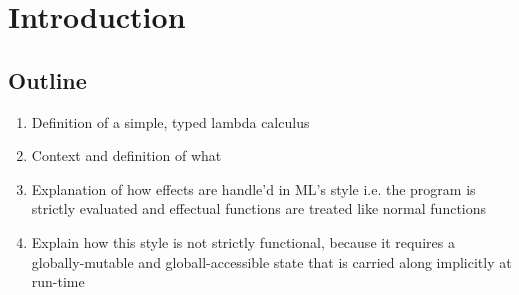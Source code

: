 \chapter{Introduction}

\section{Outline}
\begin{enumerate}
  \item Definition of a simple, typed lambda calculus
  \item Context and definition of what 
  \item Explanation of how effects are handle'd in ML's style i.e. the program is strictly evaluated and effectual functions are treated like normal functions
  \item Explain how this style is not strictly functional, because it requires a globally-mutable and globall-accessible state that is carried along implicitly at run-time
\end{enumerate}
